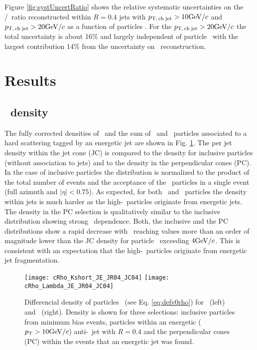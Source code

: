 Figure \ref{fig:systUncertRatio} shows the relative systematic uncertainties on the \lda/\ks\ ratio reconstructed within $R=0.4$ jets with $p_\mathrm{T,\,ch\;jet} > 10 \mathrm{GeV}/c$ and $p_\mathrm{T,\,ch\;jet} > 20 \mathrm{GeV}/c$ as a function of particles \pt. 
For the $p_\mathrm{T,\,ch\;jet} > 20 \mathrm{GeV}/c$ the total uncertainty is about 16\% and largely independent of particle \pt\ with the largest contribution 14\% from the uncertainty on \Vzero\ reconstruction.



\section{Results}
\label{sec:Results}

\subsection{\pt\ density}

The fully corrected densities of \ks\ and the sum of \lda\ and \alda\ particles associated to a hard scattering tagged by an energetic jet are shown in Fig. \ref{fig:rhov0}. 
The per jet density within the jet cone (JC) is compared to the density for inclusive particles (without association to jets) and to the density in the perpendicular cones (PC).
In the case of inclusive particles the distribution is normalized to the product of the total number of events and the acceptance of the \vzero\ particles in a single event (full azimuth and $|\eta|<0.75$). 
As expected, for both \ks\ and \lda\ particles the density within jets is much harder as the high-\pt\ particles originate from energetic jets. 
The density in the PC selection is qualitatively similar to the inclusive distribution showing strong \pt\ dependence. 
Both, the inclusive and the PC distributions show a rapid decrease with \pt\ reaching values more than an order of magnitude lower than the JC density for particle \pt\ exceeding $4\mathrm{GeV}/c$.
This is consistent with an expectation that the high-\pt\ particles originate from energetic jet fragmentation.

\begin{figure}[htbp]
	\centering
	\texttt{[image: cRho\_Kshort\_JE\_JR04\_JC04]}
	\texttt{[image: cRho\_Lambda\_JE\_JR04\_JC04]}
	\caption{Differencial density of particles \drhodpt\ (see Eq. \ref{eq:defv0rho}) for \ks\ (left) and \lda\ (right). Density is shown for three selections: inclusive particles from minimum bias events, particles within an energetic ($p_{\mathrm{T}}>10 \mathrm{GeV}/c$) anti-\kt\ jet with $R=0.4$ and the perpendicular cones (PC) within the events that an energetic jet was found.}
	\label{fig:rhov0}
\end{figure}


